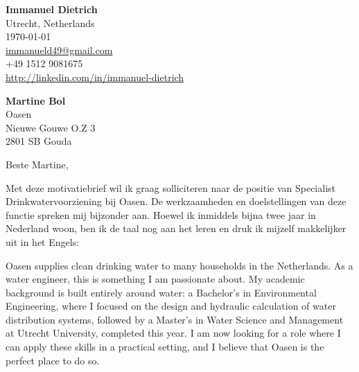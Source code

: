 \documentclass[11pt]{report}
\begin{document}
 
\begin{titlepage}

    \begin{minipage}[t]{0.95\textwidth}
        \hfill
        \raggedleft
        \textbf{Immanuel Dietrich} \\
        Utrecht, Netherlands \\
        \today\\
        \href{mailto:immanueld49@gmail.com}{immanueld49@gmail.com} \\
        +49 1512 9081675 \\
        \url{http://linkedin.com/in/immanuel-dietrich}
    \end{minipage}

\raggedright \textbf{Martine Bol} \\ Oasen  \\ Nieuwe Gouwe O.Z 3 \\  2801 SB Gouda \\ 

\vspace{0.7em}

\raggedright Beste Martine,\\


\vspace{0.7em}

Met deze motivatiebrief wil ik graag solliciteren naar de positie van Specialist Drinkwatervoorziening bij Oasen. De werkzaamheden en doelstellingen van deze functie spreken mij bijzonder aan. 
Hoewel ik inmiddels bijna twee jaar in Nederland woon, ben ik de taal nog aan het leren en druk ik mijzelf makkelijker uit in het Engels:

\vspace{0.7em}

Oasen supplies clean drinking water to many households in the Netherlands. As a water engineer, this is something I am passionate about. My academic background is built entirely around water: a Bachelor's in Environmental Engineering, 
where I focused on the design and hydraulic calculation of water distribution systems, followed by a Master's in Water Science and Management at Utrecht University, completed this year. 
I am now looking for a role where I can apply these skills in a practical setting, and I believe that Oasen is the perfect place to do so.

\vspace{0.7em}


\end{titlepage}
\end{document}
